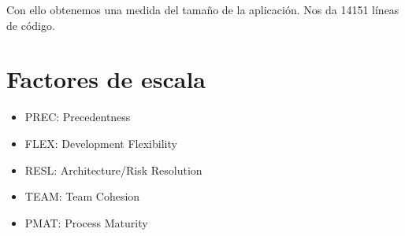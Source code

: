 \documentclass[spanish,a4paper,11pt, twoside]{report}	%
\begin{document}
\vspace{0.35cm}
\hspace{2.9cm}
\vspace{0.35cm}

Con ello obtenemos una medida del tamaño de la aplicación. Nos da 14151 líneas de código.

\section{Factores de escala}
\begin {itemize}
	\item {PREC: Precedentness}
	\item {FLEX: Development Flexibility}
	\item {RESL: Architecture/Risk Resolution}
	\item {TEAM: Team Cohesion}
	\item {PMAT: Process Maturity}
\end{itemize}
\end{document}
